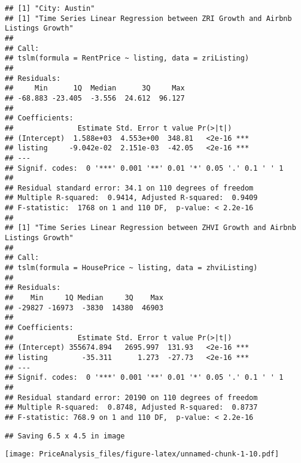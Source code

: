 \documentclass[
]{article}
\begin{document}
\begin{verbatim}
## [1] "City: Austin"
## [1] "Time Series Linear Regression between ZRI Growth and Airbnb Listings Growth"
## 
## Call:
## tslm(formula = RentPrice ~ listing, data = zriListing)
## 
## Residuals:
##     Min      1Q  Median      3Q     Max 
## -68.883 -23.405  -3.556  24.612  96.127 
## 
## Coefficients:
##               Estimate Std. Error t value Pr(>|t|)    
## (Intercept)  1.588e+03  4.553e+00  348.81   <2e-16 ***
## listing     -9.042e-02  2.151e-03  -42.05   <2e-16 ***
## ---
## Signif. codes:  0 '***' 0.001 '**' 0.01 '*' 0.05 '.' 0.1 ' ' 1
## 
## Residual standard error: 34.1 on 110 degrees of freedom
## Multiple R-squared:  0.9414, Adjusted R-squared:  0.9409 
## F-statistic:  1768 on 1 and 110 DF,  p-value: < 2.2e-16
## 
## [1] "Time Series Linear Regression between ZHVI Growth and Airbnb Listings Growth"
## 
## Call:
## tslm(formula = HousePrice ~ listing, data = zhviListing)
## 
## Residuals:
##    Min     1Q Median     3Q    Max 
## -29827 -16973  -3830  14380  46903 
## 
## Coefficients:
##               Estimate Std. Error t value Pr(>|t|)    
## (Intercept) 355674.894   2695.997  131.93   <2e-16 ***
## listing        -35.311      1.273  -27.73   <2e-16 ***
## ---
## Signif. codes:  0 '***' 0.001 '**' 0.01 '*' 0.05 '.' 0.1 ' ' 1
## 
## Residual standard error: 20190 on 110 degrees of freedom
## Multiple R-squared:  0.8748, Adjusted R-squared:  0.8737 
## F-statistic: 768.9 on 1 and 110 DF,  p-value: < 2.2e-16
\end{verbatim}

\begin{verbatim}
## Saving 6.5 x 4.5 in image
\end{verbatim}

\texttt{[image: PriceAnalysis\_files/figure-latex/unnamed-chunk-1-10.pdf]}
\end{document}
